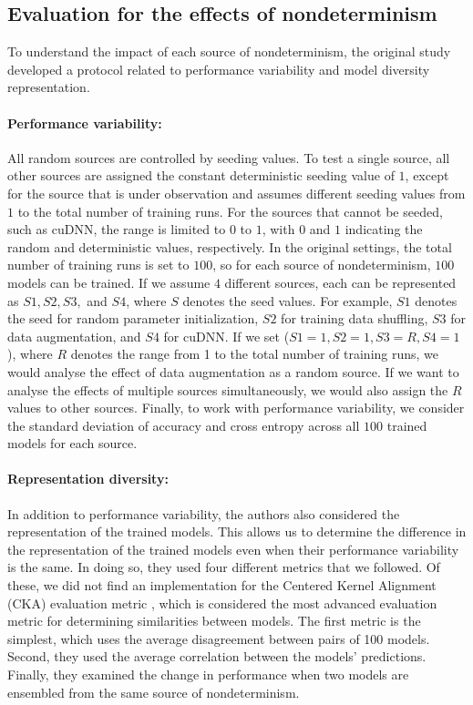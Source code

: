 \subsection{Evaluation for the effects of nondeterminism}
To understand the impact of each source of nondeterminism, the original study developed a protocol related to performance variability and model diversity representation. 
\paragraph{Performance variability:}
All random sources are controlled by seeding values. To test a single source, all other sources are assigned the constant deterministic seeding value of $1$, except for the source that is under observation and assumes different seeding values from $1$ to the total number of training runs. For the sources that cannot be seeded, such as cuDNN, the range is limited to $0$ to $1$, with $0$ and $1$ indicating the random and deterministic values, respectively. In the original settings, the total number of training runs is set to $100$, so for each source of nondeterminism, $100$ models can be trained. If we assume $4$ different sources, each can be represented as $S1, S2, S3,$ and $S4$, where $S$ denotes the seed values. For example, $S1$ denotes the seed for random parameter initialization, $S2$ for training data shuffling, $S3$ for data augmentation, and $S4$ for cuDNN. If we set ($S1=1, S2=1, S3=R, S4=1$), where $R$ denotes the range from 1 to the total number of training runs, we would analyse the effect of data augmentation as a random source. If we want to analyse the effects of multiple sources simultaneously, we would also assign the $R$ values to other sources. Finally, to work with performance variability, we consider the standard deviation of accuracy and cross entropy across all $100$ trained models for each source.
\paragraph{Representation diversity:}
In addition to performance variability, the authors also considered the representation of the trained models. This allows us to determine the difference in the representation of the trained models even when their performance variability is the same. In doing so, they used four different metrics that we followed. Of these, we did not find an implementation for the Centered Kernel Alignment (CKA) evaluation metric \citep{kornblith2019similarity}, which is considered the most advanced evaluation metric for determining similarities between models. The first metric is the simplest, which uses the average disagreement between pairs of 100 models. Second, they used the average correlation between the models' predictions. Finally, they examined the change in performance when two models are ensembled from the same source of nondeterminism.
